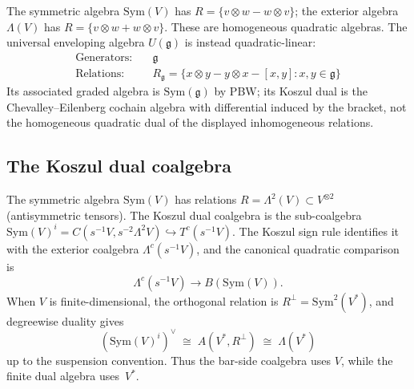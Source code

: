 \begin{example}
\label{ex:classical-quadratic-algebras}
The symmetric algebra $\mathrm{Sym}(V)$ has
$R = \{v \otimes w - w \otimes v\}$; the exterior algebra
$\Lambda(V)$ has $R = \{v \otimes w + w \otimes v\}$. These are
homogeneous quadratic algebras. The universal enveloping algebra
$U(\mathfrak{g})$ is instead quadratic-linear:
\begin{align}
\text{Generators:} &\quad \mathfrak{g} \\
\text{Relations:} &\quad R_{\mathfrak{g}} = \{x \otimes y - y \otimes x - [x,y] : x,y \in \mathfrak{g}\}
\end{align}
Its associated graded algebra is $\mathrm{Sym}(\mathfrak g)$ by
PBW; its Koszul dual is the Chevalley--Eilenberg cochain algebra
with differential induced by the bracket, not the homogeneous
quadratic dual of the displayed inhomogeneous relations.
\end{example}

\subsection{The Koszul dual coalgebra}

\begin{example}
\label{ex:com-lie-koszul-coalgebra}
The symmetric algebra $\mathrm{Sym}(V)$ has relations
$R = \Lambda^2(V) \subset V^{\otimes 2}$ (antisymmetric tensors).
The Koszul dual coalgebra is the sub-coalgebra
$\mathrm{Sym}(V)^i=C(s^{-1}V,s^{-2}\Lambda^2V)\hookrightarrow T^c(s^{-1}V)$.
The Koszul sign rule identifies it with the exterior coalgebra
$\Lambda^c(s^{-1}V)$, and the canonical quadratic comparison is
\[
 \Lambda^c(s^{-1}V)\longrightarrow B(\mathrm{Sym}(V)).
\]
When $V$ is finite-dimensional, the orthogonal relation is
$R^\perp=\mathrm{Sym}^2(V^*)$, and degreewise duality gives
\[
(\mathrm{Sym}(V)^i)^\vee
\;\cong\;
A(V^*,R^\perp)
\;\cong\;
\Lambda(V^*)
\]
up to the suspension convention. Thus the bar-side coalgebra uses
$V$, while the finite dual algebra uses~$V^*$.
\end{example}

